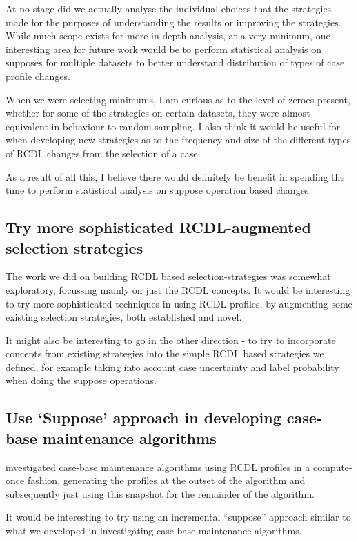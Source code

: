 \documentclass[a4paper,11pt]{report}
\begin{document}
At no stage did we actually analyse the individual choices that the strategies made for the purposes of understanding the results or improving the strategies. While much scope exists for more in depth analysis, at a very minimum, one interesting area for future work would be to perform statistical analysis on supposes for multiple datasets to better understand distribution of types of case profile changes.

When we were selecting minimums, I am curious as to the level of zeroes present, whether for some of the strategies on certain datasets, they were almost equivalent in behaviour to random sampling. I also think it would be useful for when developing new strategies as to the frequency and size of the different types of RCDL changes from the selection of a case.

As a result of all this, I believe there would definitely be benefit in spending the time to perform statistical analysis on suppose operation based changes.

\subsection{Try more sophisticated RCDL-augmented selection strategies}

The work we did on building RCDL based selection-strategies was somewhat exploratory, focussing mainly on just the RCDL concepts. It would be interesting to try more sophisticated techniques in using RCDL profiles, by augmenting some existing selection strategies, both established and novel.

It might also be interesting to go in the other direction - to try to incorporate concepts from existing strategies into the simple RCDL based strategies we defined, for example taking into account case uncertainty and label probability when doing the suppose operations.

\subsection{Use `Suppose' approach in developing case-base maintenance algorithms}

\citet{Delany2009} investigated case-base maintenance algorithms using RCDL profiles in a compute-once fashion, generating the profiles at the outset of the algorithm and subsequently just using this snapshot for the remainder of the algorithm.

It would be interesting to try using an incremental  ``suppose'' approach similar to what we developed in investigating case-base maintenance algorithms.
\end{document}
